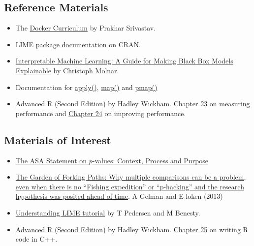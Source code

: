 \documentclass[
  letterpaper,
  DIV=11,
  numbers=noendperiod]{scrreprt}
\begin{document}
\subsection*{Reference Materials}\label{reference-materials-2}

\begin{itemize}
\item
  The \href{https://docker-curriculum.com/}{Docker Curriculum} by
  Prakhar Srivastav.
\item
  LIME
  \href{https://cran.r-project.org/web/packages/lime/index.html}{package
  documentation} on CRAN.
\item
  \href{https://christophm.github.io/interpretable-ml-book/}{Interpretable
  Machine Learning: A Guide for Making Black Box Models Explainable} by
  Christoph Molnar.
\item
  Documentation for
  \href{https://www.rdocumentation.org/packages/base/versions/3.6.2/topics/apply}{apply()},
  \href{https://purrr.tidyverse.org/reference/map.html}{map()} and
  \href{https://furrr.futureverse.org/}{pmap()}
\item
  \href{https://adv-r.hadley.nz/index.html}{Advanced R (Second Edition)}
  by Hadley Wickham.
  \href{https://adv-r.hadley.nz/perf-measure.html}{Chapter 23} on
  measuring performance and
  \href{https://adv-r.hadley.nz/perf-improve.html}{Chapter 24} on
  improving performance.
\end{itemize}

\subsection*{Materials of Interest}\label{materials-of-interest-3}

\begin{itemize}
\item
  \href{https://library-search.imperial.ac.uk/discovery/fulldisplay?docid=cdi_informaworld_taylorfrancis_310_1080_00031305_2016_1154108&context=PC&vid=44IMP_INST:ICL_VU1&lang=en&search_scope=MyInst_and_CI&adaptor=Primo\%20Central&tab=Everything&query=any,contains,ASA\%20p-value&offset=0}{The
  ASA Statement on \(p\)-values: Context, Process and Purpose}
\item
  \href{http://stat.columbia.edu/~gelman/research/unpublished/forking.pdf}{The
  Garden of Forking Paths: Why multiple comparisons can be a problem,
  even when there is no ``Fishing expedition'' or ``p-hacking'' and the
  research hypothesis was posited ahead of time}. A Gelman and E loken
  (2013)
\item
  \href{https://cran.r-project.org/web/packages/lime/vignettes/Understanding_lime.html}{Understanding
  LIME tutorial} by T Pedersen and M Benesty.
\item
  \href{https://adv-r.hadley.nz/index.html}{Advanced R (Second Edition)}
  by Hadley Wickham. \href{https://adv-r.hadley.nz/rcpp.html}{Chapter
  25} on writing R code in C++.
\end{itemize}
\end{document}
